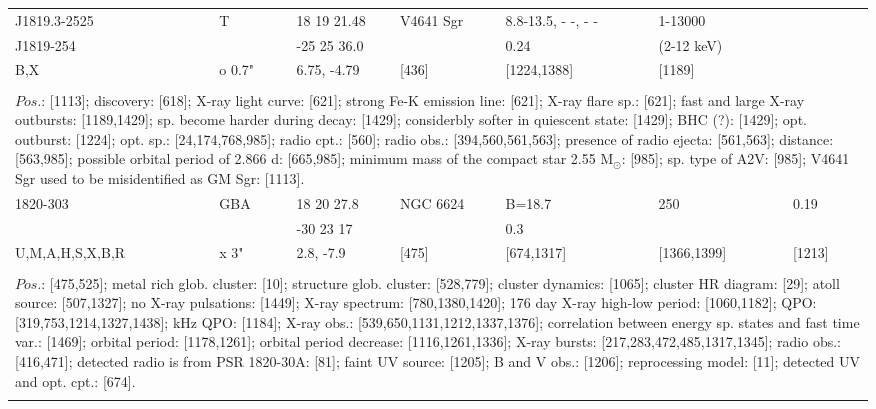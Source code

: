 \documentclass{aa}
\begin{document}
\begin{tabular}{p{2.5cm}p{1cm}p{1.8cm}p{2.3cm}p{3.3cm}p{2.0cm}p{2.2cm}}
\noalign{\smallskip}
J1819.3-2525     & T           & 18 19 21.48  & V4641 Sgr   & 8.8-13.5, - -, - -   & 1-13000        &          \\
 J1819-254         &               & -25 25 36.0   &                        & 0.24                     & (2-12 keV)   &          \\
B,X                       & o 0.7"   & 6.75, -4.79    & [436]            & [1224,1388]      & [1189]           &          \\
\\
\multicolumn{7}{p{17.5cm}}{
$Pos$.: [1113]; discovery: [618]; X-ray light curve: [621]; strong Fe-K emission line: [621]; X-ray flare sp.: [621]; 
fast and large X-ray outbursts: [1189,1429]; sp. become harder during decay: [1429]; considerbly softer in 
quiescent state: [1429]; BHC (?): [1429]; opt. outburst: [1224]; opt. sp.: [24,174,768,985]; radio cpt.: [560]; radio 
obs.: [394,560,561,563]; presence of radio ejecta: [561,563]; distance: [563,985]; possible orbital period of 
2.866 d: [665,985]; minimum mass of the compact star 2.55 M$_{\odot}$: [985]; sp. type of A2V: [985]; V4641 
Sgr used to be misidentified as GM Sgr: [1113].}\\
\noalign{\smallskip}
\hline

\noalign{\smallskip}
1820-303                    & GBA         & 18 20 27.8            & NGC 6624         & B=18.7                       & 250                   & 0.19              \\
                                     &                   & -30 23 17              &                             & 0.3                               &                           &                       \\
U,M,A,H,S,X,B,R      & x 3"           & 2.8, -7.9                & [475]                   & [674,1317]                 & [1366,1399]     & [1213]     \\
\\
\multicolumn{7}{p{17.5cm}}{
$Pos$.: [475,525]; metal rich glob. cluster: [10]; structure glob. cluster: [528,779]; cluster dynamics: [1065];
cluster HR diagram: [29]; atoll source: [507,1327]; no X-ray pulsations: [1449]; X-ray spectrum: [780,1380,1420]; 
176 day X-ray high-low period: [1060,1182]; QPO: [319,753,1214,1327,1438]; kHz QPO: [1184]; 
X-ray obs.: [539,650,1131,1212,1337,1376]; correlation between energy sp. states and fast time var.: [1469]; 
orbital period: [1178,1261]; orbital period decrease: [1116,1261,1336]; X-ray bursts: [217,283,472,485,1317,1345]; 
radio obs.: [416,471]; detected radio is from PSR 1820-30A: [81]; faint UV source: [1205]; B and V obs.: [1206]; 
reprocessing model: [11]; detected UV and opt. cpt.: [674].}\\
\noalign{\smallskip}
\hline


\end{tabular}
\end{document}
